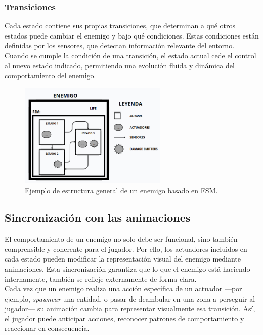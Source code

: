 \subsubsection{Transiciones}

Cada estado contiene sus propias transiciones, que determinan a qué otros estados puede cambiar el enemigo y bajo qué condiciones. Estas condiciones están definidas por los sensores, que detectan información relevante del entorno.\\

Cuando se cumple la condición de una transición, el estado actual cede el control al nuevo estado indicado, permitiendo una evolución fluida y dinámica del comportamiento del enemigo.

\begin{figure}[h]
	\centering
	\includegraphics[height=5cm]{Imagenes/EnemigoGeneral.png}
	\caption{Ejemplo de estructura general de un enemigo basado en FSM.}
	\label{fig:EnemigoGeneral}
\end{figure}
\subsection{Sincronización con las animaciones}
\label{subsec:animaciones_fsm}

El comportamiento de un enemigo no solo debe ser funcional, sino también comprensible y coherente para el jugador. Por ello, los actuadores incluidos en cada estado pueden modificar la representación visual del enemigo mediante animaciones. Esta sincronización garantiza que lo que el enemigo está haciendo internamente, también se refleje externamente de forma clara.\\

Cada vez que un enemigo realiza una acción específica de un actuador —por ejemplo, \textit{spawnear} una entidad, o pasar de deambular en una zona a perseguir al jugador— su animación cambia para representar visualmente esa transición. Así, el jugador puede anticipar acciones, reconocer patrones de comportamiento y reaccionar en consecuencia.\\

